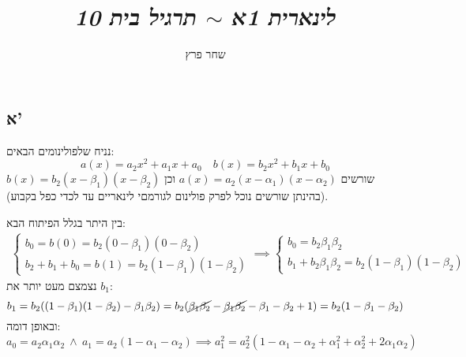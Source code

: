 \documentclass[]{article}
\author{שחר פרץ}
\title{\textit{לינארית 1א $\sim$ תרגיל בית 10}}
\newcommand\ag        {\alpha}
\newcommand\bg        {\beta}
\newcommand\dequad    {\!\!\!\!\!\!}
\theoremstyle{definition}
\begin{document}
    \maketitle
    
    \section{}
    \subsection*{א'}
    נניח שלפולינומים הבאים: 
    \[ a(x) = a_2x^2 + a_1x + a_0 \quad b(x) = b_2x^2 + b_1x + b_0 \]
    שורשים $a(x) = a_2(x - \ag_1)(x - \ag_2)$ וכן $b(x) = b_2(x - \bg_1)(x - \bg_2)$ (בהינתן שורשים נוכל לפרק פולינום לגורמםי לינאריים עד לכדי כפל בקבוע). 
    
    בין היתר בגלל הפיתוח הבא: 
    \begin{align*}
        \begin{cases}
            b_0 = b(0) = b_2(0-\bg_1)(0-\bg_2) \\
            b_2 + b_1 + b_0 =  b(1) = b_2(1 - \bg_1)(1 - \bg_2)
        \end{cases}\dequad\implies \begin{cases}
            b_0 = b_2\bg_1\bg_2 \\
            b_1 + b_2\bg_1\bg_2 = b_2(1 - \bg_1)(1 - \bg_2)
        \end{cases}
    \end{align*}
    נצמצם מעט יותר את $b_1$: 
    \[ b_1 = b_2((1 - \bg_1)(1 - \bg_2) - \bg_1\bg_2) = b_2(\cancel{\bg_1\bg_2} - \cancel{\bg_1\bg_2} - \bg_1 - \bg_2 + 1) = b_2(1 - \bg_1 - \bg_2) \]
    ובאופן דומה: 
    \[ a_0 = a_2\ag_1\ag_2 \ \land \ a_1 = a_2(1 - \ag_1 - \ag_2) \implies a_1^2 = a_2^2(1 - \ag_1 - \ag_2 + \ag_1^2 + \ag_2^2 + 2\ag_1\ag_2) \]
    
\end{document}
